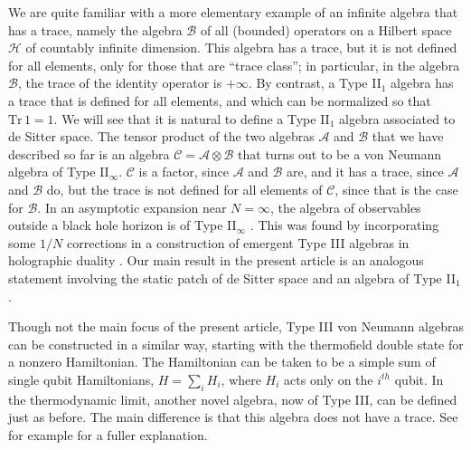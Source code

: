 \documentclass[11pt,a4paper]{article}
\def\A{{\mathcal A}}
\def\B{{\mathcal B}}
\def\H{{\mathcal H}}
\def\Tr{{\mathrm{Tr}}}
\begin{document}
We are quite familiar with a more elementary example of an infinite algebra that has a trace, namely the algebra $\B$ of all (bounded) operators on a Hilbert space
$\H$ of countably infinite dimension.   This algebra has a trace, but it is not defined for all elements, only for those that are ``trace class''; in particular, in the algebra
$\B$, the trace of the identity operator is $+\infty$.   By contrast, a Type II$_1$ algebra has a trace that is defined for all elements, and which can be normalized
so that $\Tr\,1=1$.   We will see that it is natural to define a Type II$_1$ algebra associated to de Sitter space.   The tensor product of the two algebras
$\A$ and $\B$ that we have described so far is an algebra ${\mathcal C}=\A\otimes \B$ that turns out to be a von Neumann algebra of Type II$_\infty$. ${\mathcal C}$ is a factor, since $\A$ and $\B$ are, and it has a trace, since $\A$ and $\B$ do, but the trace is not defined for all elements of ${\mathcal C}$,
since that is the case for $\B$.    In an asymptotic
expansion near $N=\infty$, the algebra of observables outside a black hole horizon is of Type II$_\infty$ \cite{GCP}.  This was found by incorporating
some $1/N$ corrections in a construction of emergent Type III algebras in holographic duality \cite{LL,LLtwo}.    Our main result in the present
article is an analogous statement involving the static patch of de Sitter space and an algebra of Type II$_1$.

Though not the main focus of the present article,
Type III von Neumann algebras can be constructed in a similar way, starting with the thermofield double state for a nonzero Hamiltonian.  The Hamiltonian
can be taken to be a simple sum of single qubit Hamiltonians, $H=\sum_i H_i$, where $H_i$ acts only on the $i^{th}$ qubit.  In the thermodynamic limit, another novel
 algebra, now of Type III,  can be defined just as before.   The main difference is that this algebra does not have a trace.  See for example \cite{Curved} for a fuller
 explanation.
\end{document}
